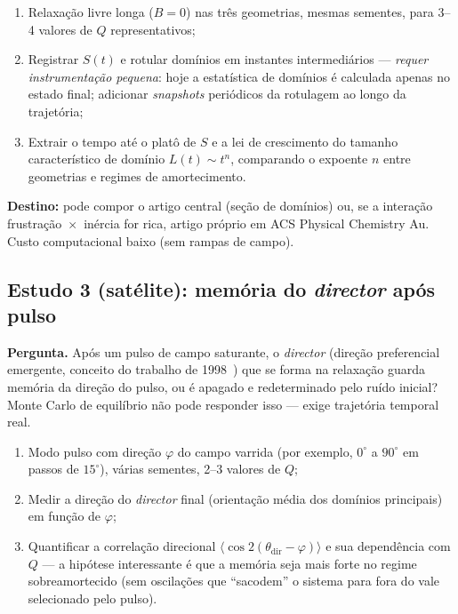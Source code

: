 \documentclass[11pt,a4paper]{article}
\begin{document}
\begin{enumerate}
\item Relaxação livre longa ($B = 0$) nas três geometrias, mesmas
sementes, para 3--4 valores de $Q$ representativos;
\item Registrar $S(t)$ e rotular domínios em instantes intermediários
--- \emph{requer instrumentação pequena}: hoje a estatística de domínios
é calculada apenas no estado final; adicionar \emph{snapshots} periódicos
da rotulagem ao longo da trajetória;
\item Extrair o tempo até o platô de $S$ e a lei de crescimento do
tamanho característico de domínio $L(t) \sim t^{n}$, comparando o
expoente $n$ entre geometrias e regimes de amortecimento.
\end{enumerate}

\textbf{Destino:} pode compor o artigo central (seção de domínios) ou,
se a interação frustração~$\times$~inércia for rica, artigo próprio em
ACS Physical Chemistry Au. Custo computacional baixo (sem rampas de
campo).

\subsection{Estudo 3 (satélite): memória do \emph{director} após pulso}

\textbf{Pergunta.} Após um pulso de campo saturante, o \emph{director}
(direção preferencial emergente, conceito do trabalho de
1998~\cite{prb1998}) que se forma na relaxação guarda memória da direção
do pulso, ou é apagado e redeterminado pelo ruído inicial? Monte Carlo
de equilíbrio não pode responder isso --- exige trajetória temporal
real.

\begin{enumerate}
\item Modo pulso com direção $\varphi$ do campo varrida (por exemplo,
$0^\circ$ a $90^\circ$ em passos de $15^\circ$), várias sementes,
2--3 valores de $Q$;
\item Medir a direção do \emph{director} final (orientação média dos
domínios principais) em função de $\varphi$;
\item Quantificar a correlação direcional
$\langle \cos 2(\theta_{\mathrm{dir}} - \varphi) \rangle$ e sua
dependência com $Q$ --- a hipótese interessante é que a memória seja
mais forte no regime sobreamortecido (sem oscilações que ``sacodem'' o
sistema para fora do vale selecionado pelo pulso).
\end{enumerate}
\end{document}
